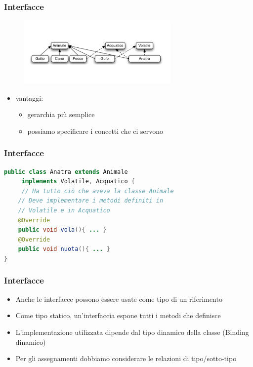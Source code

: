 \documentclass{beamer}
\begin{document}
\begin{frame}[fragile]
\frametitle{Interfacce}
\begin{figure}[h!]
  \centering
    \includegraphics[width=0.7\textwidth]{gerarchia4.pdf}
\end{figure}
\begin{itemize}
\item vantaggi:
\begin{itemize}
\item gerarchia pi\`u semplice
\item possiamo specificare i concetti che ci servono
\end{itemize}
\end{itemize}
\end{frame}

\begin{frame}[fragile]
\frametitle{Interfacce}
\begin{lstlisting}[language=Java,escapechar=|]
public class Anatra extends Animale
     implements Volatile, Acquatico { 
     // Ha tutto ciò che aveva la classe Animale
    // Deve implementare i metodi definiti in 
    // Volatile e in Acquatico 
    @Override
    public void vola(){ ... }
    @Override    
    public void nuota(){ ... } 
}
\end{lstlisting}
\end{frame}

\begin{frame}[fragile]
\frametitle{Interfacce}
 \begin{itemize}
 \item Anche le interfacce possono essere usate come tipo di un riferimento
 \item Come tipo statico, un’interfaccia espone tutti i metodi che definisce
 \item L’implementazione utilizzata dipende dal tipo dinamico della classe (Binding dinamico)
 \item Per gli assegnamenti dobbiamo considerare le relazioni di tipo/sotto-tipo
 \end{itemize}
\end{frame}
\end{document}
